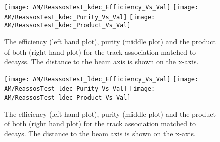\begin{figure}[!ht]
  \centering
  \texttt{[image: AM/ReassosTest\_kdec\_Efficiency\_Vs\_Val]}
  \texttt{[image: AM/ReassosTest\_kdec\_Purity\_Vs\_Val]}
  \texttt{[image: AM/ReassosTest\_kdec\_Product\_Vs\_Val]}
  \caption[Efficiency, purity and their product of the association with \PKzS{} decays for different search options as a function of distance to the beam axis]{The efficiency (left hand plot), purity (middle plot) and the product of both (right hand plot) for the track association matched to \PKzS{} decayss. The distance to the beam axis is shown on the x-axis.\label{plot:AMWFSVkdecEffAndPurSO}}
\end{figure}
\begin{figure}[!ht]
  \centering
  \texttt{[image: AM/ReassosTest\_ldec\_Efficiency\_Vs\_Val]}
  \texttt{[image: AM/ReassosTest\_ldec\_Purity\_Vs\_Val]}
  \texttt{[image: AM/ReassosTest\_ldec\_Product\_Vs\_Val]}
  \caption[Efficiency, purity and their product of the association with \PgL{} decays for different search options as a function of distance to the beam axis]{The efficiency (left hand plot), purity (middle plot) and the product of both (right hand plot) for the track association matched to \PgL{} decays. The distance to the beam axis is shown on the x-axis.\label{plot:AMWFSVldecEffAndPurSO}}
\end{figure}

